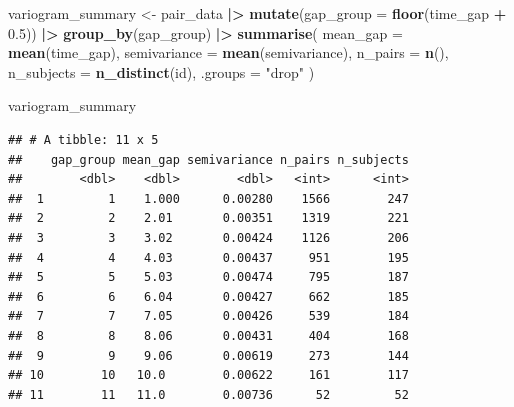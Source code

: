 \documentclass[
]{article}
\newenvironment{Shaded}{\begin{snugshade}}{\end{snugshade}}
\newcommand{\AttributeTok}[1]{\textcolor[rgb]{0.13,0.29,0.53}{#1}}
\newcommand{\FloatTok}[1]{\textcolor[rgb]{0.00,0.00,0.81}{#1}}
\newcommand{\FunctionTok}[1]{\textcolor[rgb]{0.13,0.29,0.53}{\textbf{#1}}}
\newcommand{\NormalTok}[1]{#1}
\newcommand{\OtherTok}[1]{\textcolor[rgb]{0.56,0.35,0.01}{#1}}
\newcommand{\SpecialCharTok}[1]{\textcolor[rgb]{0.81,0.36,0.00}{\textbf{#1}}}
\newcommand{\StringTok}[1]{\textcolor[rgb]{0.31,0.60,0.02}{#1}}
\begin{document}
\begin{Shaded}
\begin{Highlighting}[]
\NormalTok{variogram\_summary }\OtherTok{\textless{}{-}}\NormalTok{ pair\_data }\SpecialCharTok{|\textgreater{}}
  \FunctionTok{mutate}\NormalTok{(}\AttributeTok{gap\_group =} \FunctionTok{floor}\NormalTok{(time\_gap }\SpecialCharTok{+} \FloatTok{0.5}\NormalTok{)) }\SpecialCharTok{|\textgreater{}}
  \FunctionTok{group\_by}\NormalTok{(gap\_group) }\SpecialCharTok{|\textgreater{}}
  \FunctionTok{summarise}\NormalTok{(}
    \AttributeTok{mean\_gap =} \FunctionTok{mean}\NormalTok{(time\_gap),}
    \AttributeTok{semivariance =} \FunctionTok{mean}\NormalTok{(semivariance),}
    \AttributeTok{n\_pairs =} \FunctionTok{n}\NormalTok{(),}
    \AttributeTok{n\_subjects =} \FunctionTok{n\_distinct}\NormalTok{(id),}
    \AttributeTok{.groups =} \StringTok{"drop"}
\NormalTok{  )}

\NormalTok{variogram\_summary}
\end{Highlighting}
\end{Shaded}

\begin{verbatim}
## # A tibble: 11 x 5
##    gap_group mean_gap semivariance n_pairs n_subjects
##        <dbl>    <dbl>        <dbl>   <int>      <int>
##  1         1    1.000      0.00280    1566        247
##  2         2    2.01       0.00351    1319        221
##  3         3    3.02       0.00424    1126        206
##  4         4    4.03       0.00437     951        195
##  5         5    5.03       0.00474     795        187
##  6         6    6.04       0.00427     662        185
##  7         7    7.05       0.00426     539        184
##  8         8    8.06       0.00431     404        168
##  9         9    9.06       0.00619     273        144
## 10        10   10.0        0.00622     161        117
## 11        11   11.0        0.00736      52         52
\end{verbatim}
\end{document}
